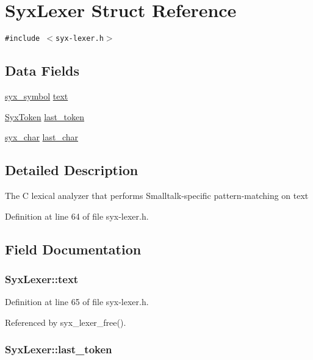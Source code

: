 \hypertarget{struct_syx_lexer}{
\section{SyxLexer Struct Reference}
\label{struct_syx_lexer}
}
{\tt \#include $<$syx-lexer.h$>$}

\subsection*{Data Fields}
\begin{CompactItemize}
\item 
\hyperlink{syx-types_8h_9663af54b7b72f5d8be5f754ef356525}{syx\_\-symbol} \hyperlink{struct_syx_lexer_62a11c30793de8836aeaf5662fa9b89f}{text}
\item 
\hyperlink{struct_syx_token}{SyxToken} \hyperlink{struct_syx_lexer_a14f92f1f803f5e168e82065368c6155}{last\_\-token}
\item 
\hyperlink{syx-types_8h_22636fad803dd674d2640c323df20a11}{syx\_\-char} \hyperlink{struct_syx_lexer_34daff41871bf401a01f6e384d3ccb9b}{last\_\-char}
\end{CompactItemize}


\subsection{Detailed Description}
The C lexical analyzer that performs Smalltalk-specific pattern-matching on text 

Definition at line 64 of file syx-lexer.h.

\subsection{Field Documentation}
\hypertarget{struct_syx_lexer_62a11c30793de8836aeaf5662fa9b89f}{
\subsubsection{ {\bf SyxLexer::text}}}
\label{struct_syx_lexer_62a11c30793de8836aeaf5662fa9b89f}




Definition at line 65 of file syx-lexer.h.

Referenced by syx\_\-lexer\_\-free().\hypertarget{struct_syx_lexer_a14f92f1f803f5e168e82065368c6155}{
\subsubsection{ {\bf SyxLexer::last\_\-token}}}
\label{struct_syx_lexer_a14f92f1f803f5e168e82065368c6155}




